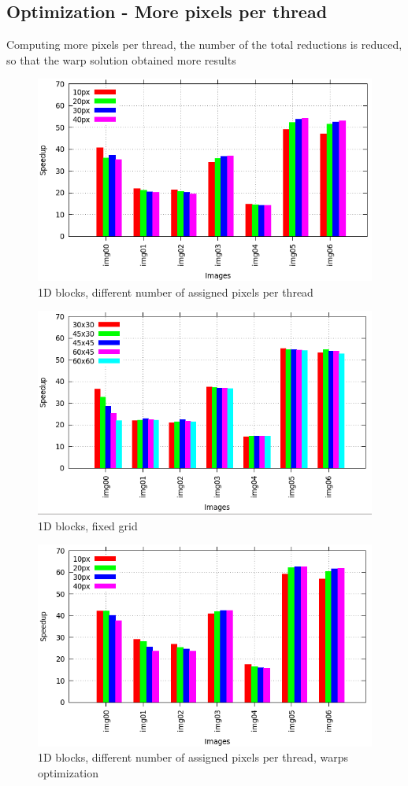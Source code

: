 \documentclass[a4paper]{article}
\begin{document}
\subsection{Optimization - More pixels per thread}
\label{sec:hop}

Computing more pixels per thread, the number of the total reductions is reduced, so that the warp solution obtained more results

\begin{figure}[!ht]
    \centering
    \includegraphics[width=0.7\linewidth]{res/new/histogram_uni_more}
    \caption{1D blocks, different number of assigned pixels per thread}
    \label{fig:hum}
\end{figure}
\FloatBarrier

\begin{figure}[!ht]
    \centering
    \includegraphics[width=0.7\linewidth]{res/new/histogram_uni_fixed}
    \caption{1D blocks, fixed grid}
    \label{fig:hfm}
\end{figure}
\FloatBarrier

\begin{figure}[!ht]
    \centering
    \includegraphics[width=0.7\linewidth]{res/new/histogram_warp_more}
    \caption{1D blocks, different number of assigned pixels per thread, warps optimization}
    \label{fig:hwm}
\end{figure}
\FloatBarrier
\end{document}
